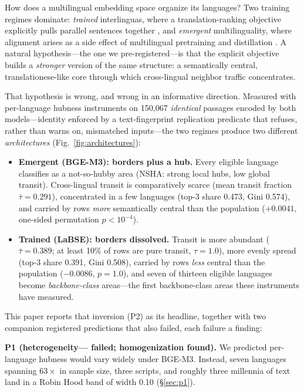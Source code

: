 \documentclass[11pt]{article}
\newcommand{\tmean}{\bar{\tau}}
\begin{document}
How does a multilingual embedding space organize its languages? Two
training regimes dominate: \emph{trained} interlinguas, where a
translation-ranking objective explicitly pulls parallel sentences together
\cite{feng2022labse}, and \emph{emergent} multilinguality, where alignment
arises as a side effect of multilingual pretraining and distillation
\cite{chen2024bgem3}. A natural hypothesis---the one we pre-registered---is
that the explicit objective builds a \emph{stronger} version of the same
structure: a semantically central, translationese-like core through which
cross-lingual neighbor traffic concentrates.

That hypothesis is wrong, and wrong in an informative direction. Measured
with per-language hubness instruments on 150{,}067 \emph{identical}
passages encoded by both models---identity enforced by a text-fingerprint
replication predicate that refuses, rather than warns on, mismatched
inputs---the two regimes produce two different \emph{architectures}
(Fig.~\ref{fig:architectures}):

\begin{itemize}
\item \textbf{Emergent (BGE-M3): borders plus a hub.} Every eligible
language classifies as a not-so-hubby area (NSHA: strong local hubs, low
global transit). Cross-lingual transit is comparatively scarce (mean
transit fraction $\tmean = 0.291$), concentrated in a few languages
(top-3 share 0.473, Gini 0.574), and carried by rows \emph{more}
semantically central than the population ($+0.0041$, one-sided permutation
$p < 10^{-4}$).
\item \textbf{Trained (LaBSE): borders dissolved.} Transit is more
abundant ($\tmean = 0.389$; at least 10\% of rows are pure transit,
$\tau = 1.0$), more evenly spread (top-3 share 0.391, Gini 0.508), carried
by rows \emph{less} central than the population ($-0.0086$, $p = 1.0$),
and seven of thirteen eligible languages become \emph{backbone-class}
areas---the first backbone-class areas these instruments have measured.
\end{itemize}

This paper reports that inversion (P2) as its headline, together with two
companion registered predictions that also failed, each failure a finding:

\textbf{P1 (heterogeneity--- failed; homogenization found).} We predicted
per-language hubness would vary widely under BGE-M3. Instead, seven
languages spanning $63\times$ in sample size, three scripts, and roughly
three millennia of text land in a Robin Hood band of width 0.10
(\S\ref{sec:p1}).
\end{document}
